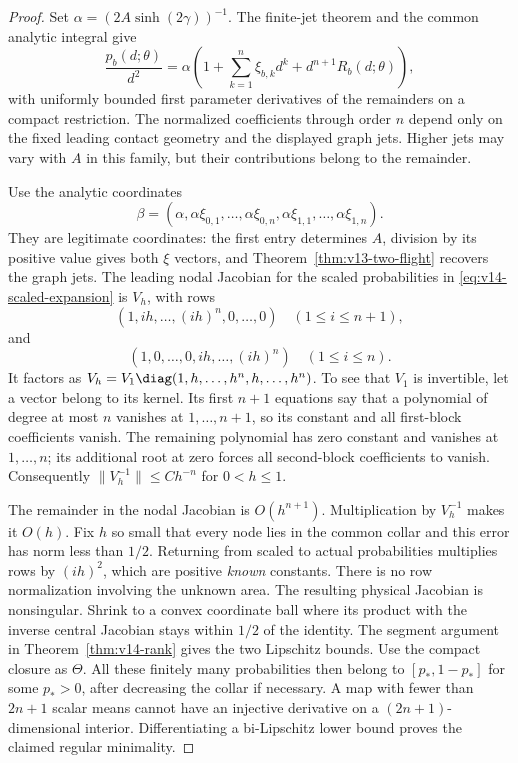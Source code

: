 \begin{proof}
Set $\alpha=(2A\sinh(2\gamma))^{-1}$. The finite-jet theorem and
the common analytic integral give
\begin{equation}\label{eq:v14-scaled-expansion}
 \frac{p_b(d;\theta)}{d^2}
 =\alpha\left(1+\sum_{k=1}^n\xi_{b,k}d^k
                            +d^{n+1}R_b(d;\theta)\right),
\end{equation}
with uniformly bounded first parameter derivatives of the remainders
on a compact restriction. The normalized coefficients through order
$n$ depend only on the fixed leading contact geometry and the displayed
graph jets. Higher jets may vary with $A$ in this family, but their
contributions belong to the remainder.

Use the analytic coordinates
\[
 \beta=(\alpha,\alpha\xi_{0,1},\ldots,\alpha\xi_{0,n},
                  \alpha\xi_{1,1},\ldots,\alpha\xi_{1,n}).
\]
They are legitimate coordinates: the first entry determines $A$,
division by its positive value gives both $\xi$ vectors, and
Theorem~\ref{thm:v13-two-flight} recovers the graph jets.
The leading nodal Jacobian for the scaled probabilities in
\eqref{eq:v14-scaled-expansion} is $V_h$, with rows
\[
 (1,ih,\ldots,(ih)^n,0,\ldots,0)\quad(1\le i\le n+1),
\]
and
\[
 (1,0,\ldots,0,ih,\ldots,(ih)^n)\quad(1\le i\le n).
\]
It factors as
$V_h=V_1\diag(1,h,\ldots,h^n,h,\ldots,h^n)$.
To see that $V_1$ is invertible, let a vector belong to its kernel.
Its first $n+1$ equations say that a polynomial of degree at most
$n$ vanishes at $1,\ldots,n+1$, so its constant and all first-block
coefficients vanish. The remaining polynomial has zero constant and
vanishes at $1,\ldots,n$; its additional root at zero forces all
second-block coefficients to vanish. Consequently
$\|V_h^{-1}\|\le C h^{-n}$ for $0<h\le1$.

The remainder in the nodal Jacobian is $O(h^{n+1})$. Multiplication
by $V_h^{-1}$ makes it $O(h)$. Fix $h$ so small that every node lies
in the common collar and this error has norm less than $1/2$.
Returning from scaled to actual probabilities multiplies rows by
$(ih)^2$, which are positive \emph{known} constants. There is no row
normalization involving the unknown area. The resulting physical
Jacobian is nonsingular. Shrink to a convex coordinate ball where
its product with the inverse central Jacobian stays within $1/2$ of
the identity. The segment argument in Theorem~\ref{thm:v14-rank}
gives the two Lipschitz bounds. Use the compact closure as $\Theta$.
All these finitely many probabilities then belong to
$[p_*,1-p_*]$ for some $p_*>0$, after decreasing the collar if
necessary. A map with fewer than $2n+1$ scalar means cannot have an
injective derivative on a $(2n+1)$-dimensional interior. Differentiating
a bi-Lipschitz lower bound proves the claimed regular minimality.


\end{proof}
